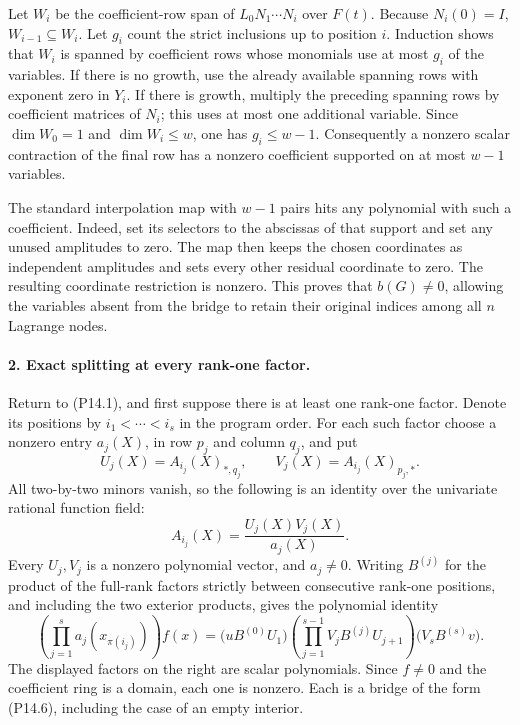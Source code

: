 \documentclass[11pt,a4paper]{article}
\theoremstyle{definition}\newtheorem{definition}{Definition}
\begin{document}
Let $W_i$ be the coefficient-row span of
$L_0N_1\cdots N_i$ over $F(t)$. Because $N_i(0)=I$,
$W_{i-1}\subseteq W_i$. Let $g_i$ count the strict inclusions
up to position $i$. Induction shows that $W_i$ is spanned by
coefficient rows whose monomials use at most $g_i$ of the
variables. If there is no growth, use the already available
spanning rows with exponent zero in $Y_i$. If there is growth,
multiply the preceding spanning rows by coefficient matrices
of $N_i$; this uses at most one additional variable. Since
$\dim W_0=1$ and $\dim W_i\leq w$, one has $g_i\leq w-1$.
Consequently a nonzero scalar contraction of the final row
has a nonzero coefficient supported on at most $w-1$ variables.

The standard interpolation map with $w-1$ pairs hits any
polynomial with such a coefficient. Indeed, set its selectors
to the abscissas of that support and set any unused amplitudes
to zero. The map then keeps the chosen coordinates as independent
amplitudes and sets every other residual coordinate to zero.
The resulting coordinate restriction is nonzero. This proves
that $b(G)\ne0$, allowing the variables absent from the bridge
to retain their original indices among all $n$ Lagrange nodes.

\paragraph{2. Exact splitting at every rank-one factor.}
Return to (P14.1), and first suppose there is at least one rank-one
factor. Denote its positions by $i_1<\cdots<i_s$ in the program
order. For each such factor choose a nonzero entry $a_j(X)$,
in row $p_j$ and column $q_j$, and put
\[
 U_j(X)=A_{i_j}(X)_{*,q_j},\qquad
 V_j(X)=A_{i_j}(X)_{p_j,*}.
\]
All two-by-two minors vanish, so the following is an identity
over the univariate rational function field:
\[
 A_{i_j}(X)=\frac{U_j(X)V_j(X)}{a_j(X)}.
 \tag{P14.9}
\]
Every $U_j,V_j$ is a nonzero polynomial vector, and $a_j\ne0$.
Writing $B^{(j)}$ for the product of the full-rank factors
strictly between consecutive rank-one positions, and including
the two exterior products, gives the polynomial identity
\[
 \left(\prod_{j=1}^{s}a_j(x_{\pi(i_j)})\right) f(x)
   =\bigl(uB^{(0)}U_1\bigr)
      \left(\prod_{j=1}^{s-1}V_jB^{(j)}U_{j+1}\right)
       \bigl(V_sB^{(s)}v\bigr).
 \tag{P14.10}
\]
The displayed factors on the right are scalar polynomials.
Since $f\ne0$ and the coefficient ring is a domain, each one
is nonzero. Each is a bridge of the form (P14.6), including
the case of an empty interior.
\end{document}
